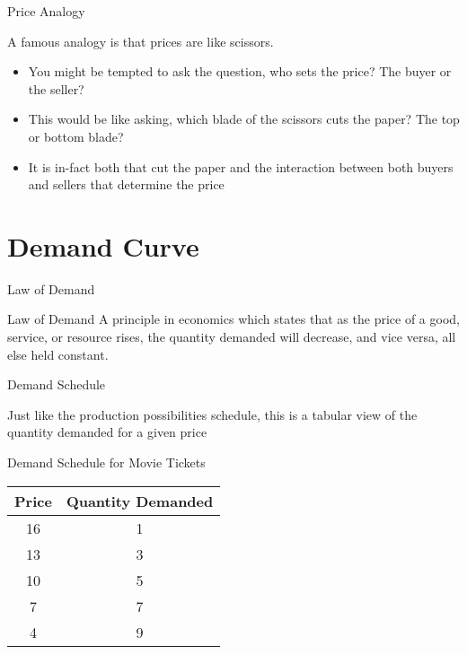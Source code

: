 \documentclass{beamer}
\begin{document}
\begin{frame}{Price Analogy}

\begin{exampleblock}

A famous analogy is that prices are like scissors. 

\begin{itemize}

\item You might be tempted to ask the question, who sets the price? The buyer or the seller?
\item This would be like asking, which blade of the scissors cuts the paper? The top or bottom blade?
\item It is in-fact both that cut the paper and the interaction between both buyers and sellers that determine the price
\end{itemize}

\end{exampleblock}

\end{frame}



\section{Demand Curve}

\begin{frame}{Law of Demand}

\begin{block}{Law of Demand}
A principle in economics which states that as the price of a good, service, or resource rises, the quantity demanded will decrease, and vice versa, all else held constant.
\end{block}

\end{frame}

\begin{frame}{Demand Schedule}

Just like the production possibilities schedule, this is a tabular view of the quantity demanded for a given price

\begin{exampleblock}{Demand Schedule for Movie Tickets}

\begin{center}
\begin{tabular}{  c  c  }\hline
 Price & Quantity Demanded \\\hline
16 & 1\\ 
13 & 3\\
10 & 5\\
7 & 7\\
4 & 9\\\hline
\end{tabular}
\end{center}
\end{exampleblock}


\end{frame}
\end{document}

